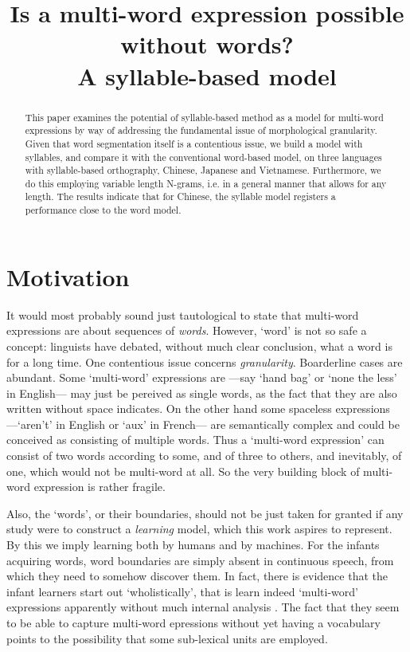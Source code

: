 \documentclass{article}
\begin{document}
\title{Is a multi-word expression possible without words? \\A syllable-based model}

\maketitle

\begin{abstract}

This paper examines the potential of syllable-based method as a model for multi-word expressions by way of addressing the fundamental issue of morphological granularity. Given that word segmentation itself is a contentious issue, we build a model with syllables, and compare it with the conventional word-based model, on three languages with syllable-based orthography, Chinese, Japanese and Vietnamese. Furthermore, we do this employing variable length N-grams, i.e. in a general manner that allows for any length. The results indicate that for Chinese, the syllable model registers a performance close to the word model.

\end{abstract}

\section{Motivation}

It would most probably sound just tautological to state that multi-word expressions are about sequences of \emph{words}. However, `word' is not so safe a concept: linguists have debated, without much clear conclusion, what a word is for a long time. One contentious issue concerns \emph{granularity}. Boarderline cases are abundant. Some `multi-word' expressions are ---say `hand bag' or `none the less' in English--- may just be pereived as single words, as the fact that they are also written without space indicates. On the other hand some spaceless expressions ---`aren't' in English or `aux' in French--- are semantically complex and could be conceived as consisting of multiple words. Thus a `multi-word expression' can consist of two words according to some, and of three to others, and inevitably, of one, which would not be multi-word at all. So the very building block of multi-word expression is rather fragile.

Also, the `words', or their boundaries, should not be just taken for granted if any study were to construct a \emph{learning} model, which this work aspires to represent. By this we imply learning both by humans and by machines. For the infants acquiring words, word boundaries are simply absent in continuous speech, from which they need to somehow discover them. In fact, there is evidence that the infant learners start out `wholistically', that is learn indeed `multi-word' expressions apparently without much internal analysis \cite{Clark09,Tomasello03}. The fact that they seem to be able to capture multi-word epressions without yet having a vocabulary points to the possibility that some sub-lexical units are employed. 
\end{document}

